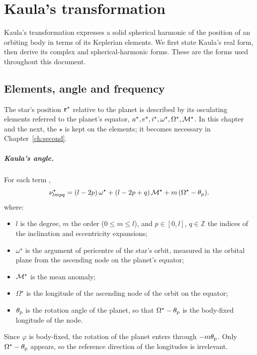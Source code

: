 \chapter{Kaula's transformation}\label{ch:kaula}

Kaula's transformation expresses a solid spherical harmonic of the position of an orbiting body in terms of its Keplerian elements. We first state Kaula's real form, then derive its complex and spherical-harmonic forms. These are the forms used throughout this document.

\section{Elements, angle and frequency}
The star's position $\mathbf r^\star$ relative to the planet is described by its osculating elements referred to the planet's equator, $a^\star,e^\star,i^\star,\omega^\star,\Omega^\star,\mathcal{M}^\star$. In this chapter and the next, the $\star$ is kept on the elements; it becomes necessary in Chapter~\ref{ch:second}.

\paragraph{Kaula's angle.} For each term \citep[eq.~3.71]{Kaula2000},
\begin{equation}
  \nu^\star_{lmpq}=(l-2p)\,\omega^\star+(l-2p+q)\,\mathcal{M}^\star+m\,(\Omega^\star-\theta_{\mathrm p}). \label{eq:nu}
\end{equation}
where:
\begin{itemize}
  \item $l$ is the degree, $m$ the order ($0\le m\le l$), and $p\in[0,l]$, $q\in\mathbb Z$ the indices of the inclination and eccentricity expansions;
  \item $\omega^\star$ is the argument of pericentre of the star's orbit, measured in the orbital plane from the ascending node on the planet's equator;
  \item $\mathcal{M}^\star$ is the mean anomaly;
  \item $\Omega^\star$ is the longitude of the ascending node of the orbit on the equator;
  \item $\theta_{\mathrm p}$ is the rotation angle of the planet, so that $\Omega^\star-\theta_{\mathrm p}$ is the body-fixed longitude of the node.
\end{itemize}
Since $\varphi$ is body-fixed, the rotation of the planet enters through $-m\theta_{\mathrm p}$. Only $\Omega^\star-\theta_{\mathrm p}$ appears, so the reference direction of the longitudes is irrelevant.

